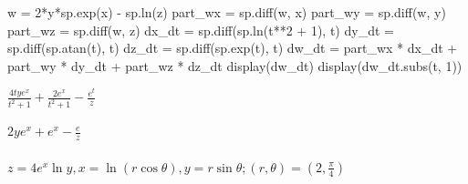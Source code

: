 \documentclass[
  letterpaper,
  DIV=11,
  numbers=noendperiod]{scrartcl}
\let\oldparagraph\paragraph
\renewcommand{\paragraph}[1]{\oldparagraph{#1}\mbox{}}
\newenvironment{Shaded}{\begin{snugshade}}{\end{snugshade}}
\newcommand{\DecValTok}[1]{\textcolor[rgb]{0.68,0.00,0.00}{#1}}
\newcommand{\NormalTok}[1]{\textcolor[rgb]{0.00,0.23,0.31}{#1}}
\newcommand{\OperatorTok}[1]{\textcolor[rgb]{0.37,0.37,0.37}{#1}}
\begin{document}
\begin{Shaded}
\begin{Highlighting}[numbers=left,,]
\NormalTok{w }\OperatorTok{=} \DecValTok{2}\OperatorTok{*}\NormalTok{y}\OperatorTok{*}\NormalTok{sp.exp(x) }\OperatorTok{{-}}\NormalTok{ sp.ln(z)}
\NormalTok{part\_wx }\OperatorTok{=}\NormalTok{ sp.diff(w, x)}
\NormalTok{part\_wy }\OperatorTok{=}\NormalTok{ sp.diff(w, y)}
\NormalTok{part\_wz }\OperatorTok{=}\NormalTok{ sp.diff(w, z)}
\NormalTok{dx\_dt }\OperatorTok{=}\NormalTok{ sp.diff(sp.ln(t}\OperatorTok{**}\DecValTok{2} \OperatorTok{+} \DecValTok{1}\NormalTok{), t)}
\NormalTok{dy\_dt }\OperatorTok{=}\NormalTok{ sp.diff(sp.atan(t), t)}
\NormalTok{dz\_dt }\OperatorTok{=}\NormalTok{ sp.diff(sp.exp(t), t)}
\NormalTok{dw\_dt }\OperatorTok{=}\NormalTok{ part\_wx }\OperatorTok{*}\NormalTok{ dx\_dt }\OperatorTok{+}\NormalTok{ part\_wy }\OperatorTok{*}\NormalTok{ dy\_dt }\OperatorTok{+}\NormalTok{ part\_wz }\OperatorTok{*}\NormalTok{ dz\_dt}
\NormalTok{display(dw\_dt)}
\NormalTok{display(dw\_dt.subs(t, }\DecValTok{1}\NormalTok{))}
\end{Highlighting}
\end{Shaded}

$\displaystyle \frac{4 t y e^{x}}{t^{2} + 1} + \frac{2 e^{x}}{t^{2} + 1} - \frac{e^{t}}{z}$

$\displaystyle 2 y e^{x} + e^{x} - \frac{e}{z}$

\hypertarget{z-4exln-y-xln-rcostheta-yrsintheta-r-theta-left2-fracpi4right}{%
\paragraph{\texorpdfstring{\(z = 4e^x\ln y, x=\ln (r\cos\theta), y=r\sin\theta; (r, \theta) = \left(2, \frac{\pi}{4}\right)\)}{z = 4e\^{}x\textbackslash ln y, x=\textbackslash ln (r\textbackslash cos\textbackslash theta), y=r\textbackslash sin\textbackslash theta; (r, \textbackslash theta) = \textbackslash left(2, \textbackslash frac\{\textbackslash pi\}\{4\}\textbackslash right)}}\label{z-4exln-y-xln-rcostheta-yrsintheta-r-theta-left2-fracpi4right}}
\end{document}
